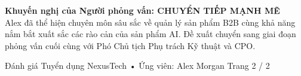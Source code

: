 \noindent\textbf{Khuyến nghị của Người phỏng vấn: CHUYỂN TIẾP MẠNH MẼ} \\
Alex đã thể hiện chuyên môn sâu sắc về quản lý sản phẩm B2B cùng khả năng nắm bắt xuất sắc các rào cản của sản phẩm AI. Đề xuất chuyển sang giai đoạn phỏng vấn cuối cùng với Phó Chủ tịch Phụ trách Kỹ thuật và CPO.

\vfill
\noindent\small{Đánh giá Tuyển dụng NexusTech • Ứng viên: Alex Morgan \hfill Trang 2 / 2}
